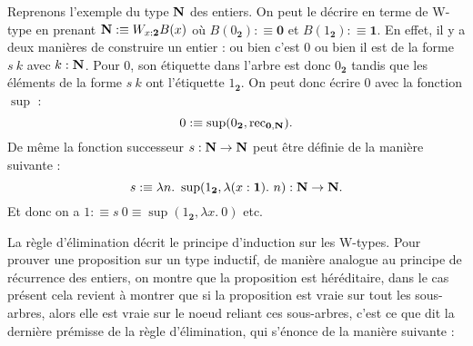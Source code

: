 \documentclass[../../rapport.tex]{subfiles}
\begin{document}
  \begin{figure}[ht]
    \centering
  \end{figure}

  Reprenons l'exemple du type $\mathbf N$ des entiers.
  On peut le décrire en terme de W-type en prenant $\mathbf N :\equiv W_{x: \textbf{2}}B(x)$ où $B(0_{\textbf{2}}) :\equiv \textbf{0}$
  et $B(1_{\textbf{2}}) :\equiv \textbf{1}$.
  En effet, il y a deux manières de construire un entier : ou bien c'est 0 ou bien il est de la forme $s\ k$ avec $k : \mathbf N$.
  Pour 0, son étiquette dans l'arbre est donc $0_{\textbf{2}}$ tandis que les éléments de la forme $s\ k$ ont l'étiquette
  $1_{\textbf{2}}$.
  On peut donc écrire 0 avec la fonction $\sup$ :
  $$ 0 :\equiv \sup(0_{\textbf{2}}, \operatorname{rec}_{\textbf{0}, \mathbf N}).$$
  De même la fonction successeur $s : \mathbf N \rightarrow \mathbf N$ peut être définie de la manière suivante :
  $$ s :\equiv \lambda n.\ \sup(1_{\textbf{2}}, \lambda(x : \textbf{1}).\ n) : \N \fun \N.$$
  Et donc on a $1 :\equiv s\ 0 \equiv \sup(1_{\textbf{2}}, \lambda x.\ 0)$ etc.

  La règle d'élimination décrit le principe d'induction sur les W-types.
  Pour prouver une proposition sur un type inductif, de manière analogue au principe de récurrence des entiers,
  on montre que la proposition est héréditaire, dans le cas présent cela revient à montrer que si la proposition est vraie
  sur tout les sous-arbres, alors elle est vraie sur le noeud reliant ces sous-arbres, c'est ce que dit la dernière prémisse
  de la règle d'élimination, qui s'énonce de la manière suivante :
\end{document}
